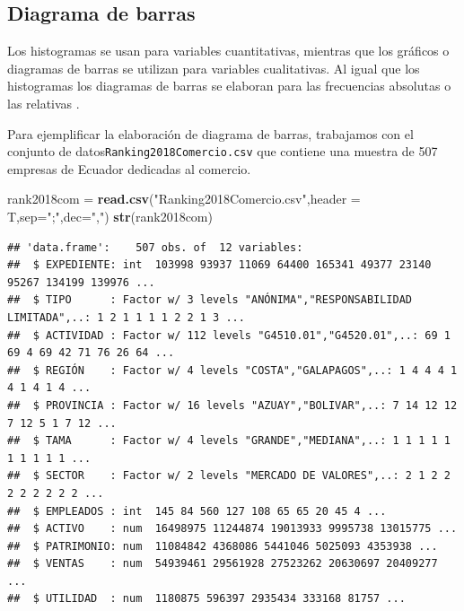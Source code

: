 \documentclass[letterpaper,]{book}
\newenvironment{Shaded}{\begin{snugshade}}{\end{snugshade}}
\newcommand{\DataTypeTok}[1]{\textcolor[rgb]{0.13,0.29,0.53}{#1}}
\newcommand{\KeywordTok}[1]{\textcolor[rgb]{0.13,0.29,0.53}{\textbf{#1}}}
\newcommand{\NormalTok}[1]{#1}
\newcommand{\StringTok}[1]{\textcolor[rgb]{0.31,0.60,0.02}{#1}}
\begin{document}
\newpage

\hypertarget{diagrama-de-barras}{%
\subsection{Diagrama de barras}\label{diagrama-de-barras}}

Los histogramas se usan para variables cuantitativas, mientras que los gráficos o diagramas de barras se utilizan para variables cualitativas. Al igual que los histogramas los diagramas de barras se elaboran para las frecuencias absolutas o las relativas \citep{kwm2016}.

Para ejemplificar la elaboración de diagrama de barras, trabajamos con el conjunto de datos\texttt{Ranking2018Comercio.csv} que contiene una muestra de 507 empresas de Ecuador dedicadas al comercio.

\begin{Shaded}
\begin{Highlighting}[]
\NormalTok{rank2018com =}\StringTok{ }\KeywordTok{read.csv}\NormalTok{(}\StringTok{"Ranking2018Comercio.csv"}\NormalTok{,}\DataTypeTok{header =}\NormalTok{ T,}\DataTypeTok{sep=}\StringTok{";"}\NormalTok{,}\DataTypeTok{dec=}\StringTok{","}\NormalTok{)}
\KeywordTok{str}\NormalTok{(rank2018com)}
\end{Highlighting}
\end{Shaded}

\begin{verbatim}
## 'data.frame':    507 obs. of  12 variables:
##  $ EXPEDIENTE: int  103998 93937 11069 64400 165341 49377 23140 95267 134199 139976 ...
##  $ TIPO      : Factor w/ 3 levels "ANÓNIMA","RESPONSABILIDAD LIMITADA",..: 1 2 1 1 1 1 2 2 1 3 ...
##  $ ACTIVIDAD : Factor w/ 112 levels "G4510.01","G4520.01",..: 69 1 69 4 69 42 71 76 26 64 ...
##  $ REGIÓN    : Factor w/ 4 levels "COSTA","GALAPAGOS",..: 1 4 4 4 1 4 1 4 1 4 ...
##  $ PROVINCIA : Factor w/ 16 levels "AZUAY","BOLIVAR",..: 7 14 12 12 7 12 5 1 7 12 ...
##  $ TAMA      : Factor w/ 4 levels "GRANDE","MEDIANA",..: 1 1 1 1 1 1 1 1 1 1 ...
##  $ SECTOR    : Factor w/ 2 levels "MERCADO DE VALORES",..: 2 1 2 2 2 2 2 2 2 2 ...
##  $ EMPLEADOS : int  145 84 560 127 108 65 65 20 45 4 ...
##  $ ACTIVO    : num  16498975 11244874 19013933 9995738 13015775 ...
##  $ PATRIMONIO: num  11084842 4368086 5441046 5025093 4353938 ...
##  $ VENTAS    : num  54939461 29561928 27523262 20630697 20409277 ...
##  $ UTILIDAD  : num  1180875 596397 2935434 333168 81757 ...
\end{verbatim}
\end{document}
